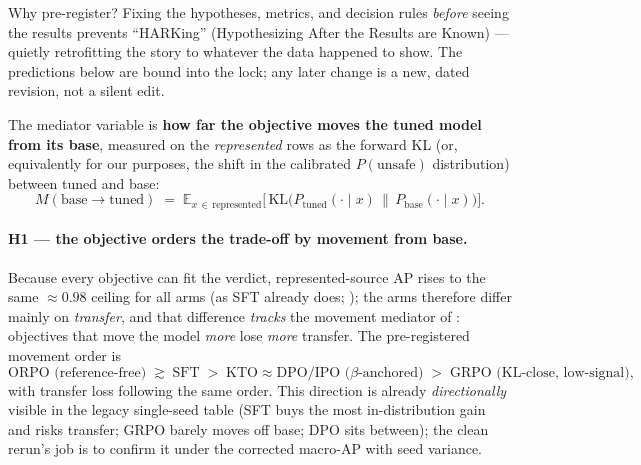 \begin{background}{Why pre-register?}
Fixing the hypotheses, metrics, and decision rules \emph{before} seeing the results prevents ``HARKing''
(Hypothesizing After the Results are Known) --- quietly retrofitting the story to whatever the data
happened to show. The predictions below are bound into the lock; any later change is a new, dated
revision, not a silent edit.
\end{background}

The mediator variable is \textbf{how far the objective moves the tuned model from its base}, measured on
the \emph{represented} rows as the forward KL (or, equivalently for our purposes, the shift in the
calibrated $P(\text{unsafe})$ distribution) between tuned and base:
\begin{equation}
M(\text{base}\!\to\!\text{tuned}) \;=\; \mathbb{E}_{x\,\in\,\text{represented}}
\Big[\,\mathrm{KL}\big(P_{\text{tuned}}(\cdot\mid x)\,\big\|\,P_{\text{base}}(\cdot\mid x)\big)\Big].
\label{eq:movement}
\end{equation}

\paragraph{H1 --- the objective orders the trade-off by movement from base.} Because every objective can
fit the verdict, represented-source AP rises to the same $\approx\!0.98$ ceiling for all arms (as SFT
already does; ); the arms therefore differ mainly on \emph{transfer}, and that
difference \emph{tracks} the movement mediator of : objectives that move the model
\emph{more} lose \emph{more} transfer. The pre-registered movement order is
\[
\text{ORPO (reference-free)} \;\gtrsim\; \text{SFT} \;>\; \text{KTO} \approx \text{DPO/IPO ($\beta$-anchored)} \;>\; \text{GRPO (KL-close, low-signal)},
\]
with transfer loss following the same order. This direction is already \emph{directionally} visible in the
legacy single-seed table (SFT buys the most in-distribution gain and risks transfer; GRPO barely moves off
base; DPO sits between); the clean rerun's job is to confirm it under the corrected macro-AP with seed
variance.

